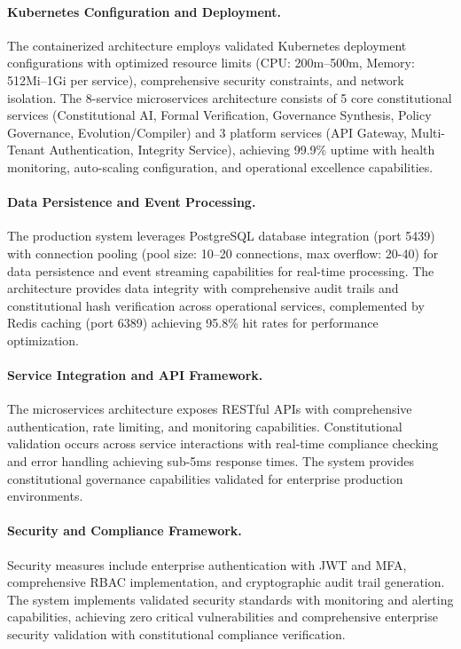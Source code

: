 \documentclass[manuscript,screen,9pt]{acmart}
\begin{document}
\paragraph{Kubernetes Configuration and Deployment.} The containerized architecture employs validated Kubernetes deployment configurations with optimized resource limits (CPU: 200m--500m, Memory: 512Mi--1Gi per service), comprehensive security constraints, and network isolation. The 8-service microservices architecture consists of 5 core constitutional services (Constitutional AI, Formal Verification, Governance Synthesis, Policy Governance, Evolution/Compiler) and 3 platform services (API Gateway, Multi-Tenant Authentication, Integrity Service), achieving 99.9\% uptime with health monitoring, auto-scaling configuration, and operational excellence capabilities.

\paragraph{Data Persistence and Event Processing.} The production system leverages PostgreSQL database integration (port 5439) with connection pooling (pool size: 10--20 connections, max overflow: 20-40) for data persistence and event streaming capabilities for real-time processing.
The architecture provides data integrity with comprehensive audit trails and constitutional hash verification across operational services, complemented by Redis caching (port 6389) achieving 95.8\% hit rates for performance optimization.

\paragraph{Service Integration and API Framework.} The microservices architecture exposes RESTful APIs with comprehensive authentication, rate limiting, and monitoring capabilities. Constitutional validation occurs across service interactions with real-time compliance checking and error handling achieving sub-5ms response times. The system provides constitutional governance capabilities validated for enterprise production environments.

\paragraph{Security and Compliance Framework.} Security measures include enterprise authentication with JWT and MFA, comprehensive RBAC implementation, and cryptographic audit trail generation. The system implements validated security standards with monitoring and alerting capabilities, achieving zero critical vulnerabilities and comprehensive enterprise security validation with constitutional compliance verification.
\end{document}
